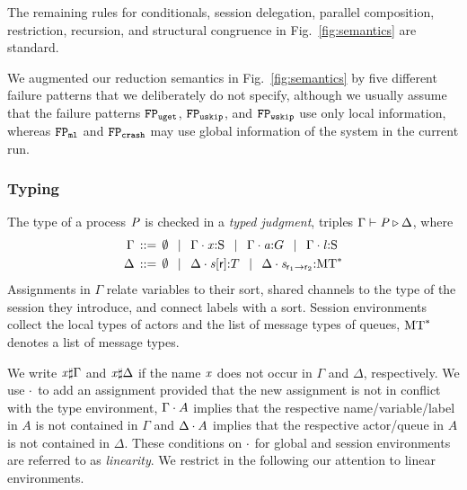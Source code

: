 The remaining rules for conditionals, session delegation, parallel composition, restriction, recursion, and structural congruence in Fig.~\ref{fig:semantics} are standard.

We augmented our reduction semantics in Fig.~\ref{fig:semantics} by five different failure patterns that we deliberately do not specify, although we usually assume that the failure patterns $ \fpUGet $, $ \fpUSkip $, and $ \fpWSkip $ use only local information, whereas $ \fpML $ and $ \fpCrash $ may use global information of the system in the current run.

\subsubsection{Typing} %
The type of a process $ \PT $ is checked in a \emph{typed judgment}, \ie triples $ \Gamma \vdash \PT \triangleright \Delta $, where
\begin{align*}
	\Gamma & \deffTerms \emptyset
		\sepTerms \Gamma \compS \Typed{\Args}{\Sort}
		\sepTerms \Gamma \compS \Typed{\Chan[a]}{\GT}
		\sepTerms \Gamma \compS \Typed{\Label}{\Sort}\\
	\Delta &\deffTerms \emptyset
		\sepTerms \Delta \compS \Typed{\AT{\Chan}{\Role}}{\LT}
		\sepTerms \Delta \compS \MQ{\Chan}{\Role_1}{\Role_2}{\MT^*}
\end{align*}
Assignments in $ \Gamma $ relate variables to their sort, shared channels to the type of the session they introduce, and connect labels with a sort.
Session environments collect the local types of actors and the list of message types of queues, \ie $ \MT^* $ denotes a list of message types.

We write $ \Args \sharp \Gamma $ and $ \Args \sharp \Delta $ if the name $ \Args $ does not occur in $ \Gamma $ and $ \Delta $, respectively.
We use $ \compS $ to add an assignment provided that the new assignment is not in conflict with the type environment, \ie $ \Gamma \compS A $ implies that the respective name/variable/label in $ A $ is not contained in $ \Gamma $ and $ \Delta \compS A $ implies that the respective actor/queue in $ A $ is not contained in $ \Delta $.
These conditions on $ \compS $ for global and session environments are referred to as \emph{linearity}.
We restrict in the following our attention to linear environments.

